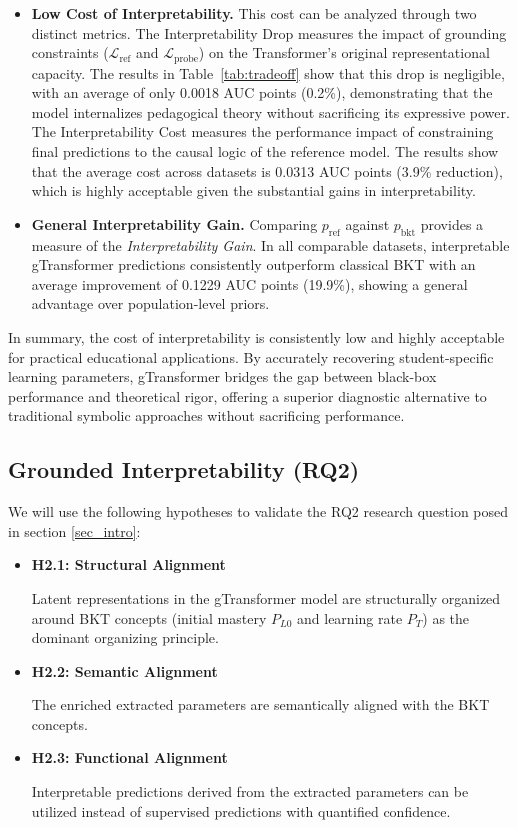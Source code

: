 \documentclass[applsci,article,submit,moreauthors,pdftex]{Definitions/mdpi}
\begin{document}
\begin{itemize}
    \item \textbf{Low Cost of Interpretability.} This cost can be analyzed through two distinct metrics. The Interpretability Drop measures the impact of grounding constraints ($\mathcal{L}_{\text{ref}}$ and $\mathcal{L}_{\text{probe}}$) on the Transformer's original representational capacity. The results in Table~\ref{tab:tradeoff} show that this drop is negligible, with an average of only 0.0018 AUC points (0.2\%), demonstrating that the model internalizes pedagogical theory without sacrificing its expressive power. The Interpretability Cost measures the performance impact of constraining final predictions to the causal logic of the reference model. The results show that the average cost across datasets is 0.0313 AUC points (3.9\% reduction), which is highly acceptable given the substantial gains in interpretability.
    
    \item \textbf{General Interpretability Gain.} Comparing $p_{\text{ref}}$ against $p_{\text{bkt}}$ provides a measure of the \textit{Interpretability Gain}. In all comparable datasets, interpretable gTransformer predictions consistently outperform classical BKT with an average improvement of 0.1229 AUC points (19.9\%), showing a general advantage over population-level priors. 
\end{itemize}

In summary, the cost of interpretability is consistently low and highly acceptable for practical educational applications. By accurately recovering student-specific learning parameters, gTransformer bridges the gap between black-box performance and theoretical rigor, offering a superior diagnostic alternative to traditional symbolic approaches without sacrificing performance.


\subsection{Grounded Interpretability (RQ2)} \label{sec_grounded}

We will use the following hypotheses to validate the RQ2 research question posed in section \ref{sec_intro}: 

\begin{itemize}
\item \textbf{H2.1: Structural Alignment}

Latent representations in the gTransformer model are structurally organized around BKT concepts (initial mastery $P_{L0}$ and learning rate $P_T$) as the dominant organizing principle.

\item \textbf{H2.2: Semantic Alignment}

The enriched extracted parameters are semantically aligned with the BKT concepts. 

\item \textbf{H2.3: Functional Alignment}

Interpretable predictions derived from the extracted parameters can be utilized instead of supervised predictions with quantified confidence.

\end{itemize}
\end{document}
